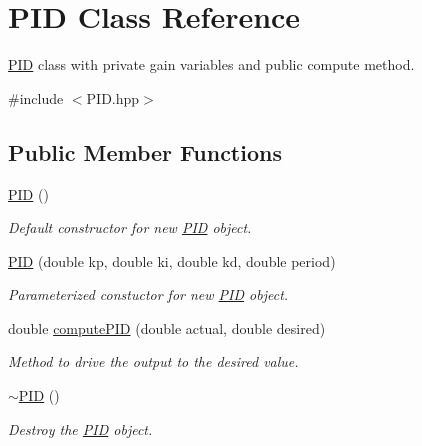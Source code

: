 \hypertarget{classPID}{}\section{P\+ID Class Reference}
\label{classPID}


\hyperlink{classPID}{P\+ID} class with private gain variables and public compute method.  




{\ttfamily \#include $<$P\+I\+D.\+hpp$>$}

\subsection*{Public Member Functions}
\begin{DoxyCompactItemize}
\item 
\mbox{\label{classPID_a0311b6f7de348499ce24e53ba353514a}} 
\hyperlink{classPID_a0311b6f7de348499ce24e53ba353514a}{P\+ID} ()
\begin{DoxyCompactList}\small\item\em Default constructor for new \hyperlink{classPID}{P\+ID} object. \end{DoxyCompactList}\item 
\hyperlink{classPID_ab085f63cbd5e30a369b7388677d5819b}{P\+ID} (double kp, double ki, double kd, double period)
\begin{DoxyCompactList}\small\item\em Parameterized constuctor for new \hyperlink{classPID}{P\+ID} object. \end{DoxyCompactList}\item 
double \hyperlink{classPID_a328cfbe7bb1be00321d013d18c969c0b}{compute\+P\+ID} (double actual, double desired)
\begin{DoxyCompactList}\small\item\em Method to drive the output to the desired value. \end{DoxyCompactList}\item 
\mbox{\label{classPID_ab7d389fc5b88d881bc25f5dafd360441}} 
\hyperlink{classPID_ab7d389fc5b88d881bc25f5dafd360441}{$\sim$\+P\+ID} ()
\begin{DoxyCompactList}\small\item\em Destroy the \hyperlink{classPID}{P\+ID} object. \end{DoxyCompactList}\end{DoxyCompactItemize}


